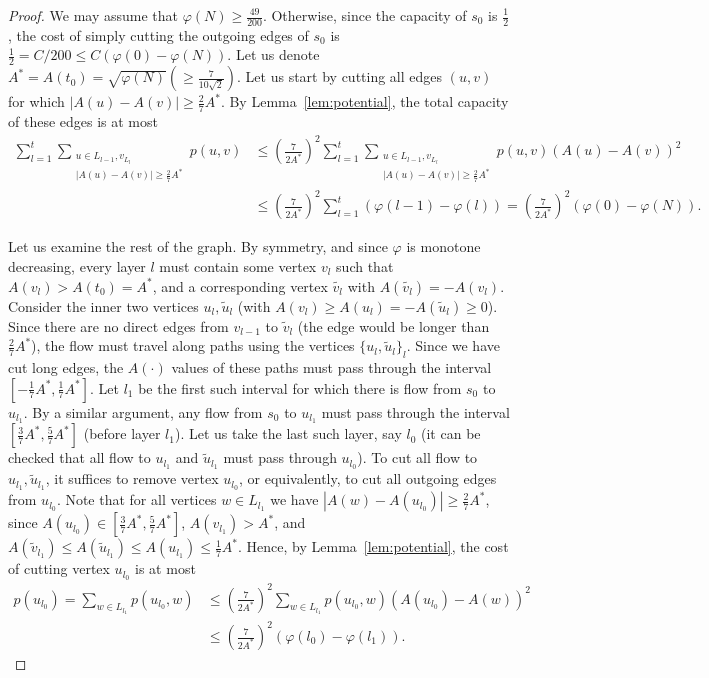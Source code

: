 \begin{proof} We may assume that $\varphi(N)\geq\frac{49}{200}$. Otherwise, since the capacity of $s_0$ is $\frac12$, the cost of simply cutting the outgoing edges of $s_0$ is ${\textstyle\frac12}=C/200\leq C(\varphi(0)-\varphi(N)).$ Let us denote $A^*=A(t_0)=\sqrt{\varphi(N)}(\geq\frac7{10\sqrt2})$. Let us start by cutting all edges $(u,v)$ for which $|A(u)-A(v)|\geq\frac27A^*$. By Lemma~\ref{lem:potential}, the total capacity of these edges is at most
\begin{equation}\label{eq:k=4edges}
\begin{split}
\sum_{l=1}^{t}\sum_{\substack{u\in L_{l-1},v_{L_l}\\|A(u)-A(v)|\geq\frac27A^*}}p(u,v)
&\leq({\textstyle\frac{7}{2A^*}})^2\sum_{l=1}^{t}\sum_{\substack{u\in L_{l-1},v_{L_l}\\|A(u)-A(v)|\geq\frac27A^*}}p(u,v)(A(u)-A(v))^2\\
&\leq({\textstyle\frac{7}{2A^*}})^2\sum_{l=1}^{t}(\varphi(l-1)-\varphi(l))=({\textstyle\frac{7}{2A^*}})^2(\varphi(0)-\varphi(N)).
\end{split}
\end{equation}

Let us examine the rest of the graph. By symmetry, and since $\varphi$ is monotone decreasing, every layer $l$ must contain some vertex $v_l$ such that $A(v_l)>A(t_0)=A^*$, and a corresponding vertex $\tilde{v_l}$ with $A(\tilde{v_l})=-A(v_l)$. Consider the inner two vertices $u_l,\tilde u_l$ (with $A(v_l)\geq A(u_l)=-A(\tilde u_l)\geq0$). Since there are no direct edges from $v_{l-1}$ to $\tilde v_l$ (the edge would be longer than $\frac27A^*$), the flow must travel along paths using the vertices $\{u_l,\tilde u_l\}_l$. Since we have cut long edges, the $A(\cdot)$ values of these paths must pass through the interval $[-\frac17A^*,\frac17A^*]$. Let $l_1$ be the first such interval for which there is flow from $s_0$ to $u_{l_1}$. By a similar argument, any flow from $s_0$ to $u_{l_1}$ must pass through the interval $[\frac37A^*,\frac57A^*]$ (before layer $l_1$). Let us take the last such layer, say $l_0$ (it can be checked that all flow to $u_{l_1}$ and $\tilde u_{l_1}$ must pass through $u_{l_0}$). To cut all flow to $u_{l_1},\tilde u_{l_1}$, it suffices to remove vertex $u_{l_0}$, or equivalently, to cut all outgoing edges from $u_{l_0}$. Note that for all vertices $w\in L_{l_1}$ we have $|A(w)-A(u_{l_0})|\geq\frac27A^*$, since $A(u_{l_0})\in [\frac37A^*,\frac57A^*]$, $A(v_{l_1})>A^*$, and $A(\tilde v_{l_1})\leq A(\tilde u_{l_1})\leq A(u_{l_1})\leq \frac17A^*$. Hence, by Lemma~\ref{lem:potential}, the cost of cutting vertex $u_{l_0}$ is at most
\begin{equation}
\begin{split}
p(u_{l_0})=\sum_{w\in L_{l_1}}p(u_{l_0},w)
&\leq({\textstyle\frac{7}{2A^*}})^2\sum_{w\in L_{l_1}}p(u_{l_0},w)(A(u_{l_0})-A(w))^2\\
&\leq({\textstyle\frac{7}{2A^*}})^2(\varphi(l_0)-\varphi(l_1)).
\end{split}
\end{equation}


\end{proof}
